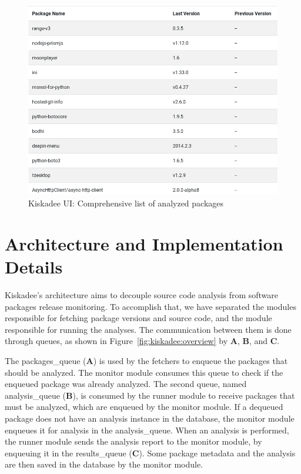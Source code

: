 \begin{figure}[!h]
  \centering
  \includegraphics[width=.95\textwidth]{figures/kiskadee-list-complete} 
  \caption{Kiskadee UI: Comprehensive list of analyzed packages}
  \label{fig:kiskadee-list-complete} 
\end{figure}

\section{Architecture and Implementation Details}
\label{sec:implementation}

Kiskadee's architecture aims to decouple source code analysis from software
packages release monitoring. To accomplish that, we have separated the modules
responsible for fetching package versions and source code, and the module
responsible for running the analyses. The communication between them is done through
queues, as shown in Figure~\ref{fig:kiskadee:overview} by \textbf{A},
\textbf{B}, and \textbf{C}.

The packages\_queue (\textbf{A}) is used by the fetchers to enqueue the
packages that should be analyzed. The monitor module consumes this queue
to check if the enqueued package was already analyzed. The second queue, named
analysis\_queue (\textbf{B}), is consumed by the runner module to receive
packages that must be analyzed, which are enqueued by the monitor module. If a
dequeued package does not have an analysis instance in the database, the
monitor module enqueues it for analysis in the analysis\_queue.  When an
analysis is performed, the runner module sends the analysis report to the
monitor module, by enqueuing it in the results\_queue (\textbf{C}). Some package
metadata and the analysis are then saved in the database by the monitor module.

